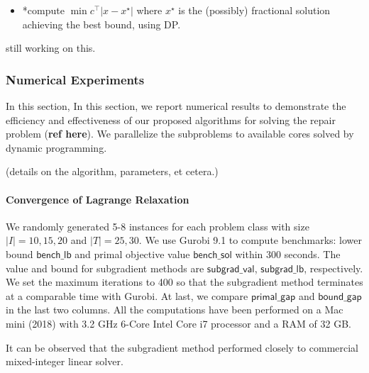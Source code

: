 \documentclass[
  a4paper,
,tablecaptionabove
]{scrartcl}
\numberwithin{equation}{section}
\providecommand{\tightlist}{%
  \setlength{\itemsep}{0pt}\setlength{\parskip}{0pt}}
\begin{document}
\begin{itemize}
  \tightlist
  \item
        *compute \(\min c ^\top | x - x^\star|\) where \(x^\star\) is the
        (possibly) fractional solution achieving the best bound, using DP.
\end{itemize}

still working on this.

\hypertarget{sec:numerical-experiments}{%
  \subsubsection{Numerical Experiments}\label{numerical-experiments}}

In this section, In this section, we report numerical results to
demonstrate the efficiency and effectiveness of our proposed algorithms
for solving the repair problem (\textbf{ref here}). We parallelize the
subproblems to available cores solved by dynamic programming.

(details on the algorithm, parameters, et cetera.)

\hypertarget{sec:convergence-of-lagrange-relaxation}{%
  \paragraph{Convergence of Lagrange
    Relaxation}\label{convergence-of-lagrange-relaxation}}

We randomly generated 5-8 instances for each problem class with size
\(|I| = 10, 15, 20\) and \(|T| = 25, 30\). We use Gurobi 9.1 to compute
benchmarks: lower bound \(\mathsf{bench\_lb}\) and primal objective
value \(\mathsf{bench\_sol}\) within 300 seconds. The value and bound
for subgradient methods are \(\mathsf{subgrad\_val}\),
\(\mathsf{subgrad\_lb}\), respectively. We set the maximum iterations to
400 so that the subgradient method terminates at a comparable time with
Gurobi. At last, we compare \(\mathsf{primal\_gap}\) and
\(\mathsf{bound\_gap}\) in the last two columns. All the computations
have been performed on a Mac mini (2018) with 3.2 GHz 6-Core Intel Core
i7 processor and a RAM of 32 GB.

It can be observed that the subgradient method performed closely to
commercial mixed-integer linear solver.
\end{document}
